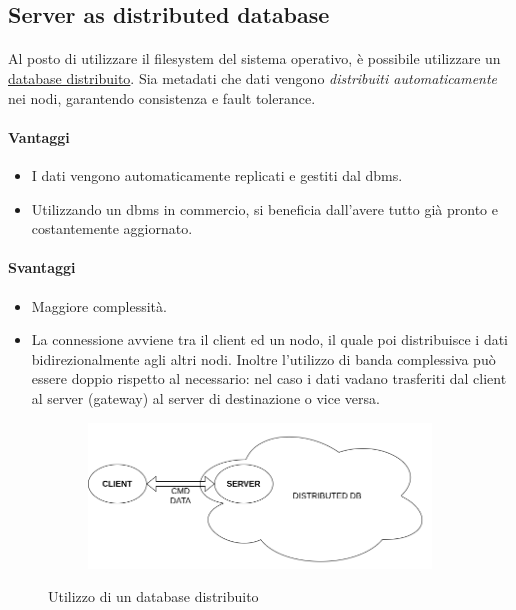 \documentclass[11pt,a4paper,english]{article}
\begin{document}
\subsection{Server as distributed database}

\paragraph{} Al posto di utilizzare il filesystem del sistema operativo, è possibile utilizzare un \underline{database distribuito}. Sia metadati che dati vengono \emph{distribuiti automaticamente} nei nodi, garantendo consistenza e fault tolerance. 


\paragraph{Vantaggi} \begin{itemize}
	\item I dati vengono automaticamente replicati e gestiti dal dbms.
	\item Utilizzando un dbms in commercio, si beneficia dall'avere tutto già pronto e costantemente aggiornato.
\end{itemize}


\paragraph{Svantaggi} \begin{itemize}
	\item Maggiore complessità.
	\item La connessione avviene tra il client ed un nodo, il quale poi distribuisce i dati bidirezionalmente agli altri nodi. Inoltre l'utilizzo di banda complessiva può essere doppio rispetto al necessario: nel caso i dati vadano trasferiti dal client al server (gateway) al server di destinazione o vice versa. 
\end{itemize}

\begin{figure}[H]
	\centering
	\begin{subfigure}{0.80\linewidth}
		\includegraphics[width=\linewidth]{../diagrams/architettura/4.png}
	\end{subfigure}
	\caption{Utilizzo di un database distribuito}
\end{figure}
\end{document}
